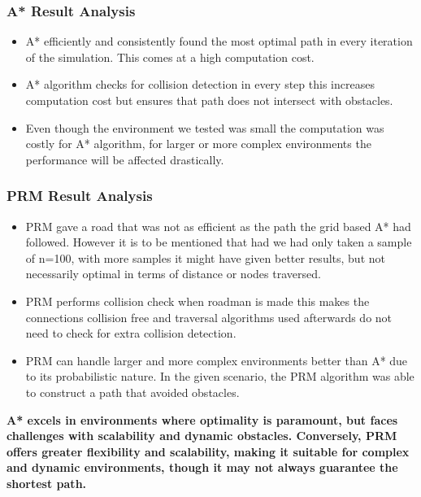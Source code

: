 \documentclass[9pt,a4paper,twoside]{rho-class/rho}
\begin{document}
\subsubsection{A* Result Analysis}

    \begin{itemize}
        \item A* efficiently and consistently found the most optimal path in every iteration of the simulation. This comes at a high computation cost.
        \item A* algorithm checks for collision detection in every step this increases computation cost but ensures that path does not intersect with obstacles.
        \item Even though the environment we tested was small the computation was costly for A* algorithm, for larger or more complex environments the performance will be affected drastically.
    \end{itemize}

\subsubsection{PRM Result Analysis}

\begin{itemize}
    \item PRM gave a road that was not as efficient as the path the grid based A* had followed. However it is to be mentioned that had we had only taken a sample of n=100, with more samples it might have given better results, but not necessarily optimal in terms of distance or nodes traversed.
    \item PRM performs collision check when roadman is made this makes the connections collision free and traversal algorithms used afterwards do not need to check for extra collision detection.
    \item PRM can handle larger and more complex environments better than A* due to its probabilistic nature. In the given scenario, the PRM algorithm was able to construct a path that avoided obstacles.
\end{itemize}



\textbf{A* excels in environments where optimality is paramount, but faces challenges with scalability and dynamic obstacles. Conversely, PRM offers greater flexibility and scalability, making it suitable for complex and dynamic environments, though it may not always guarantee the shortest path.}
\end{document}
